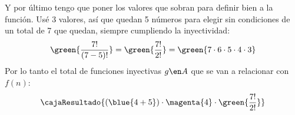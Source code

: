 \begin{enumerate}[label=\alph*)]
	      Y por último tengo que poner los valores que sobran para definir bien a la función. Usé 3 valores, así
	      que quedan 5 números para elegir sin condiciones de un total de 7 que quedan, siempre cumpliendo la inyectividad:
	      $$
		      \green{\frac{7!}{(7-5)!}} = \green{\frac{7!}{2!}} = \green{7 \cdot 6 \cdot 5 \cdot 4 \cdot 3}
	      $$
	      Por lo tanto el total de funciones inyectivas $g \en A$ que se van a relacionar con $f(n)$:
	      $$
		      \cajaResultado{
			      (\blue{4 + 5}) \cdot \magenta{4} \cdot \green{\frac{7!}{2!}}
		      }
	      $$
\end{enumerate}

\begin{aportes}
	\item {}
\end{aportes}
